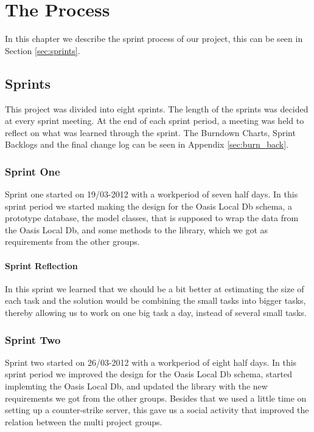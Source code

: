 \chapter{The Process}
\label{ch:SprintProcess}
In this chapter we describe the sprint process of our project, this can be seen in Section \vref{sec:sprints}.

\section{Sprints}
\label{sec:sprints}
This project was divided into eight sprints. The length of the sprints was decided at every sprint meeting. At the end of each sprint period, a meeting was held to reflect on what was learned through the sprint. The Burndown Charts, Sprint Backlogs and the final change log can be seen in Appendix \vref{sec:burn_back}.

\subsection{Sprint One}
Sprint one started on 19/03-2012 with a workperiod of seven half days. In this sprint period we started making the design for the Oasis Local Db schema, a prototype database, the model classes, that is supposed to wrap the data from the Oasis Local Db, and some methods to the library, which we got as requirements from the other groups.

\subsubsection{Sprint Reflection}
In this sprint we learned that we should be a bit better at estimating the size of each task and the solution would be combining the small tasks into bigger tasks, thereby allowing us to work on one big task a day, instead of several small tasks.

\subsection{Sprint Two}
Sprint two started on 26/03-2012 with a workperiod of eight half days. In this sprint period we improved the design for the Oasis Local Db schema, started implemting the Oasis Local Db, and updated the library with the new requirements we got from the other groups. 
Besides that we used a little time on setting up a counter-strike server, this gave us a social activity that improved the relation between the multi project groups.


